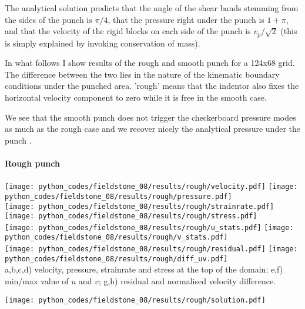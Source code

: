 The analytical solution predicts that the angle of the shear bands stemming from the sides of the punch 
is $\pi/4$, that the pressure right under the punch is $1+\pi$, 
and that the velocity of the rigid blocks on each side of the punch is $v_p/\sqrt{2}$ 
(this is simply explained by invoking conservation of mass).

In what follows I show results of the rough and smooth punch for a 124x68 grid. The difference between the two
lies in the nature of the kinematic boundary conditions under the punched area. 'rough' means that the indentor 
also fixes the horizontal velocity component to zero while it is free in the smooth case.

We see that the smooth punch does not trigger the checkerboard pressure modes as much as the rough case 
and we recover nicely the analytical pressure under the punch \cite{thfb08,gltf18}.

\newpage
\paragraph{Rough punch} 

\begin{center}
\texttt{[image: python\_codes/fieldstone\_08/results/rough/velocity.pdf]}
\texttt{[image: python\_codes/fieldstone\_08/results/rough/pressure.pdf]}\\
\texttt{[image: python\_codes/fieldstone\_08/results/rough/strainrate.pdf]}
\texttt{[image: python\_codes/fieldstone\_08/results/rough/stress.pdf]}\\
\texttt{[image: python\_codes/fieldstone\_08/results/rough/u\_stats.pdf]}
\texttt{[image: python\_codes/fieldstone\_08/results/rough/v\_stats.pdf]}\\
\texttt{[image: python\_codes/fieldstone\_08/results/rough/residual.pdf]}
\texttt{[image: python\_codes/fieldstone\_08/results/rough/diff\_uv.pdf]}\\
{\captionfont a,b,c,d) velocity, pressure, strainrate and stress at the top of the domain; 
e,f) min/max value of $u$ and $v$;
g,h) residual and normalised velocity difference.}
\end{center}

\newpage
\texttt{[image: python\_codes/fieldstone\_08/results/rough/solution.pdf]}


\newpage
